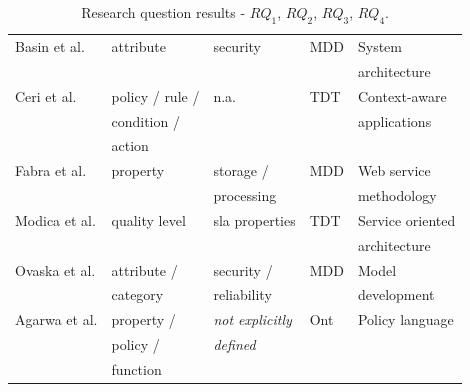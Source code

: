 \documentclass[english,12pt]{article}
\begin{document}
\begin{table}[ht!]
\begin{tabular}{l|l|l|l|l}
  \hline
  Basin et al. \cite{BasinDL06} &  attribute & security  & MDD & System \\
                                              &                &               &          &   architecture
  \\
  \hline
  Ceri et al. \cite{CeriDMF07} & policy / rule / & n.a. & TDT & Context-aware    \\
                                              & condition /    &        &        & applications     \\
                                              &  action           &         &       &          
  \\
  \hline
  Fabra et al. \cite{Fabra2011} & property & storage /     & MDD & Web service   \\
                                               &                & processing &          & methodology  \\
  \hline
  Modica et al. \cite{ModicaTV09} & quality level & sla properties & TDT &  Service oriented \\
                                                    &                    &                        &         & architecture  \\
  \hline
  Ovaska et al. \cite{OvaskaEHPA10} & attribute /  & security /    & MDD &  Model  \\
                                                        & category     & reliability    &          &   development                  \\
  \hline
  Agarwa et al. \cite{AgarwalLS09} & property /   & \textit{not explicitly}  & Ont & Policy language  \\
                                                     & policy /       & \textit{defined}          &        &                     \\
                                                     & function      &                                   &        &                \\
  \hline
  \hline  
\end{tabular} 
\caption{Research question results - $RQ_1$, $RQ_2$, $RQ_3$, $RQ_4$.}
\label{tab:result02a}
\end{table} 
\end{document}
